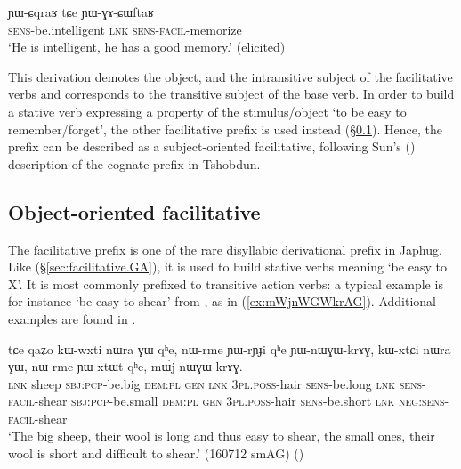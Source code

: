 \begin{exe}
\ex \label{ex:YWGACWftaR}
\gll ɲɯ-ɕqraʁ tɕe ɲɯ-ɣɤ-ɕɯftaʁ    \\
  \textsc{sens}-be.intelligent \textsc{lnk} \textsc{sens}-\textsc{facil}-memorize \\
 \glt `He is intelligent, he has a good memory.' (elicited)
\end{exe}

This derivation demotes the object, and the intransitive subject of the facilitative verbs  and  corresponds to the transitive subject of the base verb. In order to build a stative verb expressing a property of the stimulus/object `to be easy to remember/forget', the other facilitative prefix  is used instead (§\ref{sec:facilitative.nWGW}). Hence, the prefix  can be described as a subject-oriented facilitative, following Sun's (\citeyear{jackson14morpho}) description of the cognate prefix  in Tshobdun.
 
\subsection{Object-oriented facilitative} \label{sec:facilitative.nWGW}
The facilitative   prefix is one of the rare disyllabic derivational prefix in Japhug. Like  (§\ref{sec:facilitative.GA}), it is used to build stative verbs meaning `be easy to X'. It is most commonly prefixed to transitive action verbs: a typical example is for instance  `be easy to shear' from , as in (\ref{ex:mWjnWGWkrAG}). Additional examples are found in . 

\begin{exe}
\ex \label{ex:mWjnWGWkrAG}
\gll tɕe qaʑo kɯ-wxti nɯra ɣɯ qʰe, nɯ-rme ɲɯ-rɲɟi qʰe ɲɯ-nɯɣɯ-krɤɣ, kɯ-xtɕi nɯra ɣɯ, nɯ-rme ɲɯ-xtɯt qʰe, mɯ́j-nɯɣɯ-krɤɣ. \\
\textsc{lnk} sheep \textsc{sbj}:\textsc{pcp}-be.big \textsc{dem}:\textsc{pl} \textsc{gen} \textsc{lnk} \textsc{3pl}.\textsc{poss}-hair \textsc{sens}-be.long \textsc{lnk} \textsc{sens}-\textsc{facil}-shear \textsc{sbj}:\textsc{pcp}-be.small \textsc{dem}:\textsc{pl} \textsc{gen}   \textsc{3pl}.\textsc{poss}-hair \textsc{sens}-be.short \textsc{lnk} \textsc{neg}:\textsc{sens}-\textsc{facil}-shear \\
\glt `The big sheep, their wool is long and thus easy to shear, the small ones, their wool is short and difficult to shear.' (160712 smAG)
()
\end{exe}  

